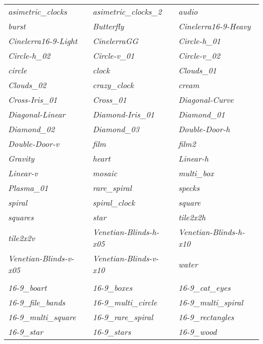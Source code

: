 \begin{center}
	\begin{longtable}{p{4cm}p{4cm}p{4cm}}
		\label{tabular:transitions}
		\textit{asimetric\_clocks} & \textit{asimetric\_clocks\_2} & \textit{audio} \\
		\textit{burst} & \textit{Butterfly} & \textit{Cinelerra16-9-Heavy} \\
		\textit{Cinelerra16-9-Light} & \textit{CinelerraGG} & \textit{Circle-h\_01} \\
		\textit{Circle-h\_02} & \textit{Circle-v\_01} & \textit{Circle-v\_02} \\
		\textit{circle} & \textit{clock} & \textit{Clouds\_01} \\
		\textit{Clouds\_02} &\textit{crazy\_clock}  & \textit{cream} \\
		\textit{Cross-Iris\_01} & \textit{Cross\_01} & \textit{Diagonal-Curve} \\
		\textit{Diagonal-Linear} & \textit{Diamond-Iris\_01} & \textit{Diamond\_01} \\
		\textit{Diamond\_02} & \textit{Diamond\_03} & \textit{Double-Door-h} \\
		\textit{Double-Door-v} & \textit{film} & \textit{film2} \\
		\textit{Gravity} & \textit{heart} & \textit{Linear-h} \\
		\textit{Linear-v} & \textit{mosaic} & \textit{multi\_box} \\
		\textit{Plasma\_01} & \textit{rare\_spiral} & \textit{specks} \\
		\textit{spiral} & \textit{spiral\_clock} & \textit{square} \\
		\textit{squares} & \textit{star} & \textit{tile2x2h} \\
		\textit{tile2x2v} & \textit{Venetian-Blinds-h-x05} & \textit{Venetian-Blinds-h-x10} \\
		\textit{Venetian-Blinds-v-x05} & \textit{Venetian-Blinds-v-x10} & \textit{water} \\
\\
		\textit{16-9\_boart} & \textit{16-9\_boxes} & \textit{16-9\_cat\_eyes} \\
		\textit{16-9\_file\_bands} & \textit{16-9\_multi\_circle} & \textit{16-9\_multi\_spiral} \\
		\textit{16-9\_multi\_square} & \textit{16-9\_rare\_spiral} & \textit{16-9\_rectangles} \\
		\textit{16-9\_star} & \textit{16-9\_stars} & \textit{16-9\_wood} \\

		\bottomrule
	\end{longtable}
\end{center}

